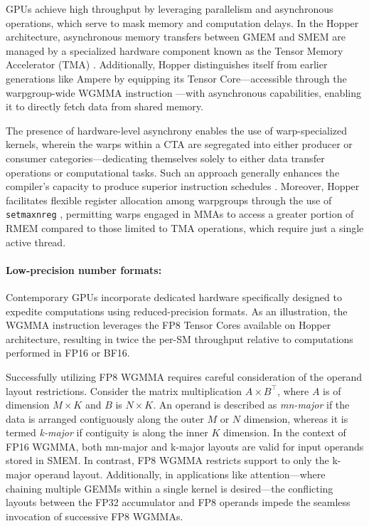 GPUs achieve high throughput by leveraging parallelism and asynchronous operations, which serve to mask memory and computation delays. In the Hopper architecture, asynchronous memory transfers between GMEM and SMEM are managed by a specialized hardware component known as the Tensor Memory Accelerator (TMA) \cite[\S7.29]{cuda}. Additionally, Hopper distinguishes itself from earlier generations like Ampere by equipping its Tensor Core—accessible through the warpgroup-wide WGMMA instruction \cite[\S9.7.14]{ptx}—with asynchronous capabilities, enabling it to directly fetch data from shared memory.

The presence of hardware-level asynchrony enables the use of warp-specialized kernels, wherein the warps within a CTA are segregated into either producer or consumer categories—dedicating themselves solely to either data transfer operations or computational tasks. Such an approach generally enhances the compiler’s capacity to produce superior instruction schedules \citep{warp-specialization-2011}. Moreover, Hopper facilitates flexible register allocation among warpgroups through the use of \verb|setmaxnreg| \cite[\S9.7.17.1]{ptx}, permitting warps engaged in MMAs to access a greater portion of RMEM compared to those limited to TMA operations, which require just a single active thread.

\paragraph{Low-precision number formats:}
\label{sec:low-precision-gpu}
Contemporary GPUs incorporate dedicated hardware specifically designed to expedite computations using reduced-precision formats. As an illustration, the WGMMA instruction leverages the FP8 Tensor Cores available on Hopper architecture, resulting in twice the per-SM throughput relative to computations performed in FP16 or BF16.

Successfully utilizing FP8 WGMMA requires careful consideration of the operand layout restrictions. Consider the matrix multiplication $A \times B^{\top}$, where $A$ is of dimension $M\times K$ and $B$ is $N\times K$. An operand is described as \emph{mn-major} if the data is arranged contiguously along the outer $M$ or $N$ dimension, whereas it is termed \emph{k-major} if contiguity is along the inner $K$ dimension. In the context of FP16 WGMMA, both mn-major and k-major layouts are valid for input operands stored in SMEM. In contrast, FP8 WGMMA restricts support to only the k-major operand layout. Additionally, in applications like attention—where chaining multiple GEMMs within a single kernel is desired—the conflicting layouts between the FP32 accumulator and FP8 operands impede the seamless invocation of successive FP8 WGMMAs.

